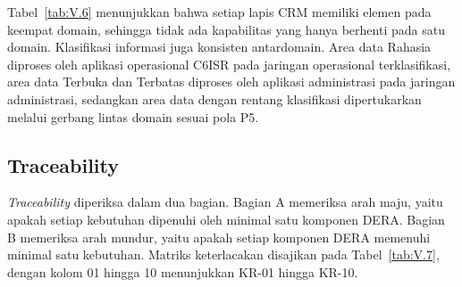 \endgroup

Tabel~\ref{tab:V.6} menunjukkan bahwa setiap lapis CRM memiliki elemen pada keempat domain, sehingga tidak ada kapabilitas yang hanya berhenti pada satu domain. Klasifikasi informasi juga konsisten antardomain. Area data Rahasia diproses oleh aplikasi operasional C6ISR pada jaringan operasional terklasifikasi, area data Terbuka dan Terbatas diproses oleh aplikasi administrasi pada jaringan administrasi, sedangkan area data dengan rentang klasifikasi dipertukarkan melalui gerbang lintas domain sesuai pola P5.

\subsection{Traceability}
\label{sec:V.2.3}

\textit{Traceability} diperiksa dalam dua bagian. Bagian A memeriksa arah maju, yaitu apakah setiap kebutuhan dipenuhi oleh minimal satu komponen DERA. Bagian B memeriksa arah mundur, yaitu apakah setiap komponen DERA memenuhi minimal satu kebutuhan. Matriks keterlacakan disajikan pada Tabel~\ref{tab:V.7}, dengan kolom 01 hingga 10 menunjukkan KR-01 hingga KR-10.

